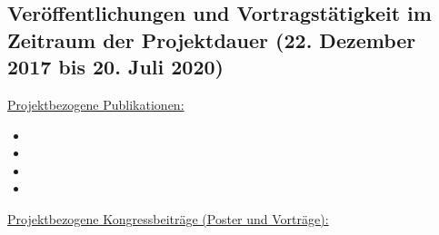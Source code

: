 \subsection*{Veröffentlichungen und Vortragstätigkeit im Zeitraum der Projektdauer (22. Dezember 2017 bis 20. Juli 2020)}
\label{cha:publications}

\underline{Projektbezogene Publikationen:}


\begin{itemize}
   
    \item 
    \item
    \item
    \item

\end{itemize}

\underline{Projektbezogene Kongressbeiträge (Poster und Vorträge):}

